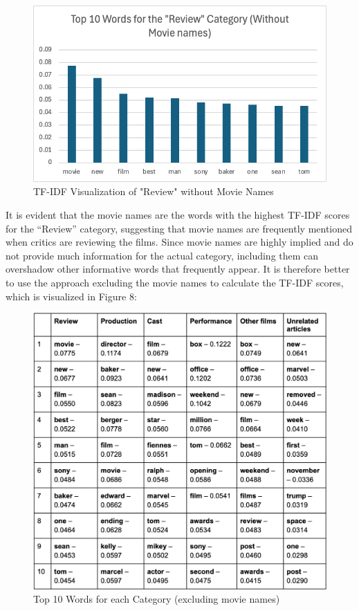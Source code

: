 \documentclass[letterpaper]{article} %
\begin{document}
\begin{figure}[H]
\centering
\includegraphics[width=0.9\columnwidth]{LaTeX/figure7.png}
\caption{TF-IDF Visualization of "Review" without Movie Names}
\label{fig:}
\end{figure}
It is evident that the movie names are the words with the highest TF-IDF scores for the “Review” category, suggesting that movie names are frequently mentioned when critics are reviewing the films. Since movie names are highly implied and do not provide much information for the actual category, including them can overshadow other informative words that frequently appear. It is therefore better to use the approach excluding the movie names to calculate the TF-IDF scores, which is visualized in Figure 8:

\begin{figure}[H]
\centering
\includegraphics[width=0.9\columnwidth]{LaTeX/figure8.png}
\caption{Top 10 Words for each Category (excluding movie names)}
\label{fig:}
\end{figure}
\end{document}
